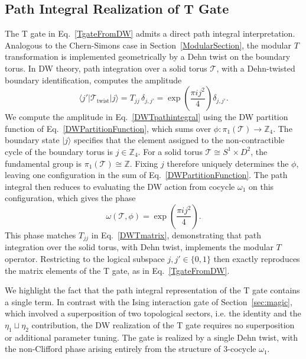 \documentclass[12pt,a4paper]{article}
\def\ket#1{{|{#1}\rangle}}
\begin{document}
\subsection{Path Integral Realization of T Gate}\label{subsec:DW_pathintegral}

The T gate in Eq.\ \eqref{TgateFromDW} admits a direct path integral interpretation. Analogous to the Chern-Simons case in Section~\ref{ModularSection}, the modular $T$ transformation is implemented geometrically by a Dehn twist on the boundary torus. In DW theory, path integration over a solid torus $\mathcal{T}$, with a Dehn-twisted boundary identification, computes the amplitude
%
\begin{equation}\label{DWTpathintegral}
\langle j' | \mathcal{T}_{\mathrm{twist}} | j \rangle = T_{jj}\,\delta_{j,j'} = \exp\left(\frac{\pi i j^2}{4}\right)\delta_{j,j'}.
\end{equation}
%
We compute the amplitude in Eq.\ \eqref{DWTpathintegral} using the DW partition function of Eq.\ \eqref{DWPartitionFunction}, which sums over $\phi : \pi_1(\mathcal{T}) \to \mathbb{Z}_4$. The boundary state $\ket{j}$ specifies that the element assigned to the non-contractible cycle of the boundary torus is $j \in \mathbb{Z}_4$. For a solid torus $\mathcal{T} \cong S^1 \times D^2$, the fundamental group is $\pi_1(\mathcal{T}) \cong \mathbb{Z}$. Fixing $j$ therefore uniquely determines the $\phi$, leaving one configuration in the sum of Eq.\ \eqref{DWPartitionFunction}. The path integral then reduces to evaluating the DW action from cocycle $\omega_1$ on this configuration, which gives the phase
%
\begin{equation}
\omega(\mathcal{T}, \phi) = \exp\left(\frac{\pi i j^2}{4}\right).
\end{equation}
%
This phase matches $T_{jj}$ in Eq.\ \eqref{DWTmatrix}, demonstrating that path integration over the solid torus, with Dehn twist, implements the modular $T$ operator. Restricting to the logical subspace $j, j' \in \{0,1\}$ then exactly reproduces the matrix elements of the T gate, as in Eq.\ \eqref{TgateFromDW}.

We highlight the fact that the path integral representation of the T gate contains a single term. In contrast with the Ising interaction gate of Section~\ref{sec:magic}, which involved a superposition of two topological sectors, i.e. the identity and the $\eta_1 \sqcup \eta_2$ contribution, the DW realization of the T gate requires no superposition or additional parameter tuning. The gate is realized by a single Dehn twist, with the non-Clifford phase arising entirely from the structure of 3-cocycle $\omega_1$.
\end{document}
